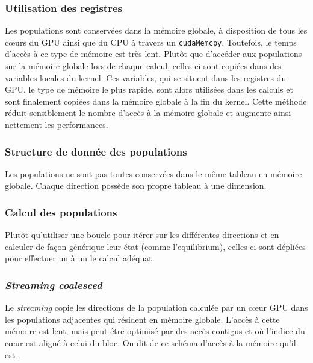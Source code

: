 \subsubsection{Utilisation des registres}
Les populations sont conservées dans la mémoire globale, à disposition de tous les cœurs du \acs{GPU} ainsi que du \acs{CPU} à travers un \texttt{cudaMemcpy}. Toutefois, le temps d'accès à ce type de mémoire est très lent. Plutôt que d'accéder aux populations sur la mémoire globale lors de chaque calcul, celles-ci sont copiées dans des variables locales du kernel. Ces variables, qui se situent dans les registres du \acs{GPU}, le type de mémoire le plus rapide, sont alors utilisées dans les calculs et sont finalement copiées dans la mémoire globale à la fin du kernel.
Cette méthode réduit sensiblement le nombre d'accès à la mémoire globale et augmente ainsi nettement les performances.
\subsubsection{Structure de donnée des populations}
Les populations ne sont pas toutes conservées dans le même tableau en mémoire globale. Chaque direction possède son propre tableau à une dimension.

\subsubsection{Calcul des populations}
Plutôt qu'utiliser une boucle pour itérer sur les différentes directions et en calculer de façon générique leur état (comme l'equilibrium), celles-ci sont dépliées pour effectuer un à un le calcul adéquat.

\subsubsection{\textit{Streaming coalesced}}\label{title-streaming-coalesced}
Le \textit{streaming} copie les directions de la population calculée par un cœur \acs{GPU} dans les populations adjacentes qui résident en mémoire globale. L'accès à cette mémoire est lent, mais peut-être optimisé par des accès contigus et où l'indice du cœur est aligné à celui du bloc. On dit de ce schéma d'accès à la mémoire qu'il est .

